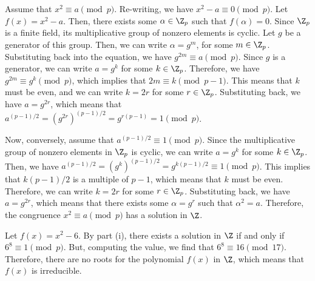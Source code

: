 \begin{solution}[(i)]
  Assume that $x^2 \equiv a \pmod{p}$. Re-writing, we have $x^2 - a \equiv 0 \pmod{p}$. Let $f(x) = x^2 - a$. Then, there exists some $\alpha \in \Z_p$ such that $f(\alpha) = 0$. Since $\Z_p$ is a finite field, its multiplicative group of nonzero elements is cyclic. Let $g$ be a generator of this group. Then, we can write $\alpha = g^m$, for some $m \in \Z_p$. Substituting back into the equation, we have $g^{2m} \equiv a \pmod{p}$. Since $g$ is a generator, we can write $a = g^k$ for some $k \in \Z_p$. Therefore, we have $g^{2m} \equiv g^k \pmod{p}$, which implies that $2m \equiv k \pmod{p-1}$. This means that $k$ must be even, and we can write $k = 2r$ for some $r \in \Z_p$. Substituting back, we have $a = g^{2r}$, which means that $a^{(p-1)/2} = (g^{2r})^{(p-1)/2} = g^{r(p-1)} = 1 \pmod{p}$.

  Now, conversely, assume that $a^{(p-1)/2} \equiv 1 \pmod{p}$. Since the multiplicative group of nonzero elements in $\Z_p$ is cyclic, we can write $a = g^k$ for some $k \in \Z_p$. Then, we have $a^{(p-1)/2} = (g^k)^{(p-1)/2} = g^{k(p-1)/2} \equiv 1 \pmod{p}$. This implies that $k(p-1)/2$ is a multiple of $p-1$, which means that $k$ must be even. Therefore, we can write $k = 2r$ for some $r \in \Z_p$. Substituting back, we have $a = g^{2r}$, which means that there exists some $\alpha = g^r$ such that $\alpha^2 = a$. Therefore, the congruence $x^2 \equiv a \pmod{p}$ has a solution in $\Z$.
\end{solution}

\begin{solution}[(ii)]
  Let $f(x) = x^2 - 6$. By part (i), there exists a solution in $\Z$ if and only if $6^8 \equiv 1 \pmod{p}$. But, computing the value, we find that $6^8 \equiv 16 \pmod{17}$. Therefore, there are no roots for the polynomial $f(x)$ in $\Z$, which means that $f(x)$ is irreducible.
\end{solution}

